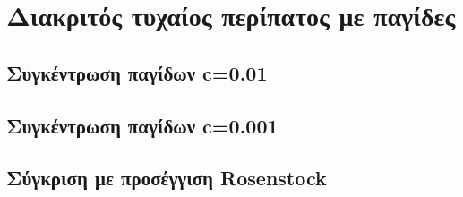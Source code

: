 \section{Διακριτός τυχαίος περίπατος με παγίδες}
\subsection{Συγκέντρωση παγίδων c=0.01}
\subsection{Συγκέντρωση παγίδων c=0.001}
\subsection{Σύγκριση με προσέγγιση Rosenstock}